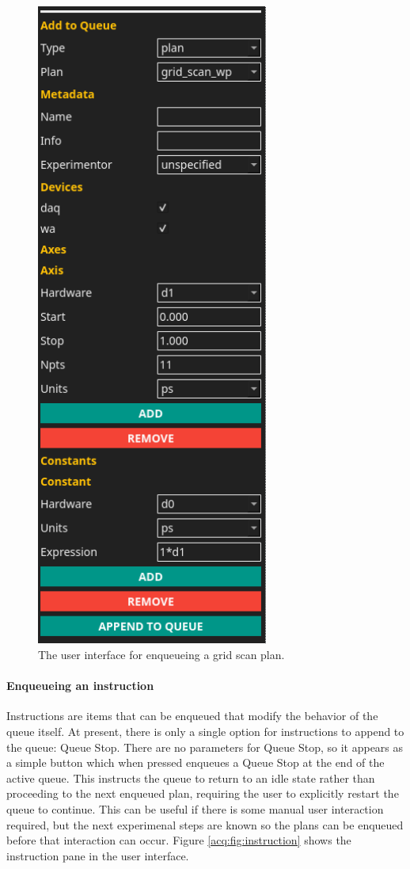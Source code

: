 \begin{figure}
\includegraphics[width=3in]{"acquisition/images/grid_scan"}
\caption[Example Plan Enqueuing UI]{
	The user interface for enqueueing a grid scan plan.
}
\label{acq:fig:grid_scan}
\end{figure}

\paragraph{Enqueueing an instruction}
Instructions are items that can be enqueued that modify the behavior of the queue itself.
At present, there is only a single option for instructions to append to the queue: Queue Stop.
There are no parameters for Queue Stop, so it appears as a simple button which when pressed enqueues a Queue Stop at the end of the active queue.
This instructs the queue to return to an idle state rather than proceeding to the next enqueued plan, requiring the user to explicitly restart the queue to continue.
This can be useful if there is some manual user interaction required, but the next experimenal steps are known so the plans can be enqueued before that interaction can occur.
Figure \ref{acq:fig:instruction} shows the instruction pane in the user interface.


